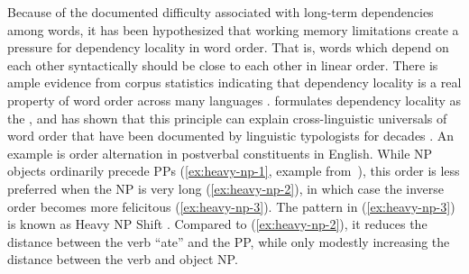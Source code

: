 Because of the documented difficulty associated with long-term dependencies among words, it has been hypothesized that working memory limitations create a pressure for dependency locality in word order. 
That is, words which depend on each other syntactically should be close to each other in linear order.
There is ample evidence from corpus statistics indicating that dependency locality is a real property of word order across many languages \citep{gildea-optimizing-2007,liu2008dependency,gildea-grammars-2010,futrell-large-scale-2015,liu-dependency-2017,temperley-minimizing-2018}. 
\citet{hawkins-performance-1994,hawkins-efficiency-2003} formulates dependency locality as the , and has shown that this principle can explain cross-linguistic universals of word order that have been documented by linguistic typologists for decades \citep{greenberg-universals-1963}. 
An example is order alternation in postverbal constituents in English.
While NP objects ordinarily precede PPs (\ref{ex:heavy-np-1}, example from~\citet{staub2006heavy}), this order is less preferred when the NP is very long (\ref{ex:heavy-np-2}), in which case the inverse order becomes more felicitous (\ref{ex:heavy-np-3}).
The pattern in (\ref{ex:heavy-np-3}) is known as Heavy NP Shift \citep{ross1967constraints,arnold2000heaviness,stallings2011s}.
Compared to (\ref{ex:heavy-np-2}), it reduces the distance between the verb ``ate'' and the PP, while only modestly increasing the distance between the verb and object NP.




